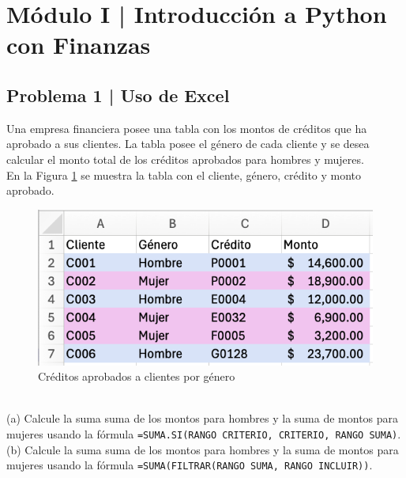 \documentclass{article}
\begin{document}
\clearpage

\section*{Módulo I | Introducción a Python con Finanzas}

\subsection*{Problema 1 | Uso de Excel}

Una empresa financiera posee una tabla con los montos de créditos que ha aprobado a sus clientes. La tabla posee el género de cada cliente y se desea calcular el monto total de los créditos aprobados para hombres y mujeres.
\\[12pt]
En la Figura \ref{fig:p101-1} se muestra la tabla con el cliente, género, crédito y monto aprobado.
\begin{figure}[!ht]
    \centering
    \begin{minipage}{\textwidth}
        \centering
        \includegraphics[width=\textwidth]{figures/p101-1.png}
    \end{minipage}
    \captionsetup{width=0.9\textwidth}
    \caption{Créditos aprobados a clientes por género}
    \label{fig:p101-1}
\end{figure}
\\
(a) Calcule la suma suma de los montos para hombres y la suma de montos para mujeres usando la fórmula \texttt{=SUMA.SI(RANGO CRITERIO, CRITERIO, RANGO SUMA)}.
\\[6pt]
(b) Calcule la suma suma de los montos para hombres y la suma de montos para mujeres usando la fórmula \texttt{=SUMA(FILTRAR(RANGO SUMA, RANGO INCLUIR))}.
\end{document}
